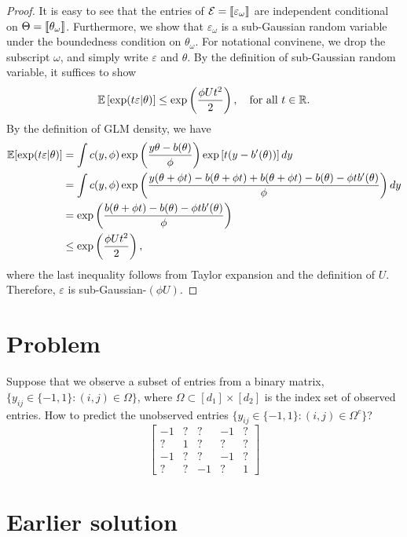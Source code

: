 \documentclass[11pt]{article}
\theoremstyle{plain}
\theoremstyle{definition}
\begin{document}
\begin{proof} It is easy to see that the entries of $\mathcal{E}=\llbracket \varepsilon_\omega \rrbracket$ are independent conditional on $\Theta=\llbracket \theta_\omega \rrbracket$. Furthermore, we show that $\varepsilon_\omega$ is a sub-Gaussian random variable under the boundedness condition on $\theta_\omega$. For notational convinene, we drop the subscript $\omega$, and simply write $\varepsilon$ and $\theta$. By the definition of sub-Gaussian random variable, it suffices to show 
\[
\mathbb{E}\left[\exp(t\varepsilon|\theta)\right]\leq \exp\left(\phi U t^2\over 2 \right), \quad \text{for all }t\in\mathbb{R}.
\]
By the definition of GLM density, we have
\begin{align}
\mathbb{E}[\exp(t\varepsilon|\theta)]&=\int c(y,\phi) \exp\left({y\theta  - b(\theta)\over \phi}   \right)\exp \left[t(y-b'(\theta))\right]dy\\
&=\int c(y,\phi)\exp \left( {y(\theta + \phi t) - b (\theta+\phi t)+b(\theta+\phi t)-b(\theta)-\phi t b'(\theta) \over \phi}\right)dy\\
&=\exp\left( {b(\theta+\phi t)-b(\theta)-\phi t b'(\theta) \over \phi} \right)\\
&\leq \exp\left(\phi U t^2\over 2 \right),
\end{align}
where the last inequality follows from Taylor expansion and the definition of $U$. Therefore, $\varepsilon$ is sub-Gaussian-$(\phi U)$. 
\end{proof}


\section{Problem}
Suppose that we observe a subset of entries from a binary matrix, $\{ y_{ij} \in \{-1,1\}\colon (i,j)\in \Omega\}$, where $\Omega\subset[d_1]\times[d_2]$ is the index set of observed entries. How to predict the unobserved entries $\{ y_{ij} \in \{-1,1\}\colon (i,j)\in \Omega^c\}$?
\begin{equation}\label{eq:model}
\begin{bmatrix}
-1&?&?&-1&?\\
?&1&?&?&?\\
-1&?&?&-1&?\\
?&?&-1&?&1
\end{bmatrix}
\end{equation}

\section{Earlier solution}
\end{document}
